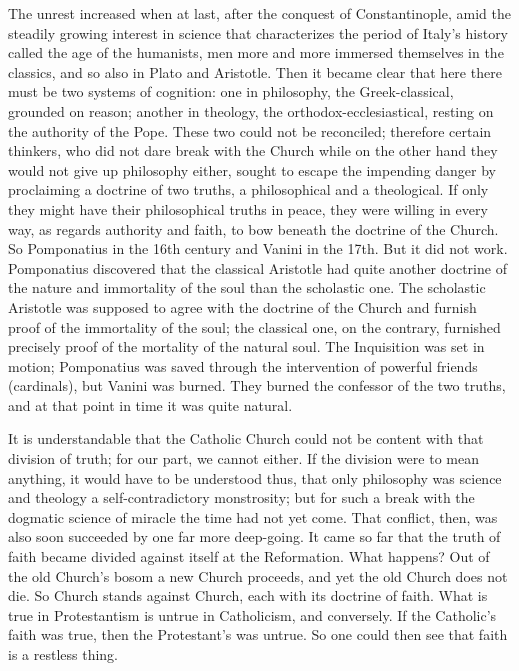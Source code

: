 \documentclass[12pt]{book}
\newcommand{\opage}[1]{\marginnote{\footnotesize\textit{[#1]}}}
\begin{document}
The unrest increased when at last, after the conquest of Constantinople, amid
the steadily growing interest in science that characterizes the period of
Italy's history called the age of the humanists, men more and more immersed
themselves in the classics, and so also in Plato and Aristotle. Then it became
clear that here there must be two systems of cognition: one in philosophy, the
Greek-classical, grounded on reason; another in theology, the
orthodox-ecclesiastical, resting on the authority of the Pope. These two could
not be reconciled; therefore certain thinkers, who
\opage{264}\setcounter{footnote}{0}%
did not dare break with the Church while on the other hand they would not give
up philosophy either, sought to escape the impending danger by proclaiming a
doctrine of two truths, a philosophical and a theological. If only they might
have their philosophical truths in peace, they were willing in every way, as
regards authority and faith, to bow beneath the doctrine of the Church. So
Pomponatius in the 16th century and Vanini in the 17th. But it did not work.
Pomponatius discovered that the classical Aristotle had quite another doctrine
of the nature and immortality of the soul than the scholastic one. The
scholastic Aristotle was supposed to agree with the doctrine of the Church and
furnish proof of the immortality of the soul; the classical one, on the
contrary, furnished precisely proof of the mortality of the natural soul. The
Inquisition was set in motion; Pomponatius was saved through the intervention
of powerful friends (cardinals), but Vanini was burned. They burned the
confessor of the two truths, and at that point in time it was quite natural.

It is understandable that the Catholic Church could not be content with that
division of truth; for our part, we cannot either. If the division were to
mean anything, it would have to be understood thus, that only philosophy was
science and theology a self-contradictory monstrosity; but for such a break
with the dogmatic science of miracle the time had not yet come. That conflict,
then, was also soon succeeded by one far more deep-going. It came so far that
the truth of faith became divided against itself at the Reformation. What
happens? Out of the old Church's bosom a new Church proceeds, and yet the old
Church does not die. So Church stands against Church, each with its doctrine
of faith. What is true in Protestantism is untrue in Catholicism, and
conversely.
\opage{265}\setcounter{footnote}{0}%
If the Catholic's faith was true, then the Protestant's was untrue. So one
could then see that faith is a restless thing.
\end{document}
